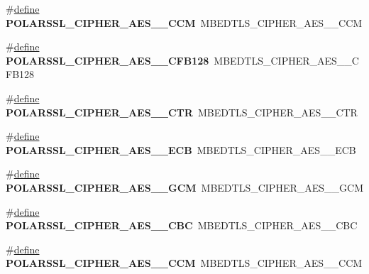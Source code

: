 \begin{DoxyCompactItemize}
\#\hyperlink{structdefine}{define} {\bfseries P\+O\+L\+A\+R\+S\+S\+L\+\_\+\+C\+I\+P\+H\+E\+R\+\_\+\+A\+E\+S\+\_\+\_\+\+C\+CM}~M\+B\+E\+D\+T\+L\+S\+\_\+\+C\+I\+P\+H\+E\+R\+\_\+\+A\+E\+S\+\_\+\_\+\+C\+CM
\item 
\mbox{\label{compat-1_83_8h_ac1717311892a945a0103fe705d33b5af}} 
\#\hyperlink{structdefine}{define} {\bfseries P\+O\+L\+A\+R\+S\+S\+L\+\_\+\+C\+I\+P\+H\+E\+R\+\_\+\+A\+E\+S\+\_\+\_\+\+C\+F\+B128}~M\+B\+E\+D\+T\+L\+S\+\_\+\+C\+I\+P\+H\+E\+R\+\_\+\+A\+E\+S\+\_\+\_\+\+C\+F\+B128
\item 
\mbox{\label{compat-1_83_8h_a02fc8b0fa400bbd5086886d64f4801bc}} 
\#\hyperlink{structdefine}{define} {\bfseries P\+O\+L\+A\+R\+S\+S\+L\+\_\+\+C\+I\+P\+H\+E\+R\+\_\+\+A\+E\+S\+\_\+\_\+\+C\+TR}~M\+B\+E\+D\+T\+L\+S\+\_\+\+C\+I\+P\+H\+E\+R\+\_\+\+A\+E\+S\+\_\+\_\+\+C\+TR
\item 
\mbox{\label{compat-1_83_8h_a94079188ceb153d0ac54217c110e9c79}} 
\#\hyperlink{structdefine}{define} {\bfseries P\+O\+L\+A\+R\+S\+S\+L\+\_\+\+C\+I\+P\+H\+E\+R\+\_\+\+A\+E\+S\+\_\+\_\+\+E\+CB}~M\+B\+E\+D\+T\+L\+S\+\_\+\+C\+I\+P\+H\+E\+R\+\_\+\+A\+E\+S\+\_\+\_\+\+E\+CB
\item 
\mbox{\label{compat-1_83_8h_ad6cbefc10c2ded3011c90cd69a8c69b6}} 
\#\hyperlink{structdefine}{define} {\bfseries P\+O\+L\+A\+R\+S\+S\+L\+\_\+\+C\+I\+P\+H\+E\+R\+\_\+\+A\+E\+S\+\_\+\_\+\+G\+CM}~M\+B\+E\+D\+T\+L\+S\+\_\+\+C\+I\+P\+H\+E\+R\+\_\+\+A\+E\+S\+\_\+\_\+\+G\+CM
\item 
\mbox{\label{compat-1_83_8h_abc86d4acaedeab07fb814973f78ef561}} 
\#\hyperlink{structdefine}{define} {\bfseries P\+O\+L\+A\+R\+S\+S\+L\+\_\+\+C\+I\+P\+H\+E\+R\+\_\+\+A\+E\+S\+\_\+\_\+\+C\+BC}~M\+B\+E\+D\+T\+L\+S\+\_\+\+C\+I\+P\+H\+E\+R\+\_\+\+A\+E\+S\+\_\+\_\+\+C\+BC
\item 
\mbox{\label{compat-1_83_8h_ad62c0dfbfd9693b1051c98e001cb7943}} 
\#\hyperlink{structdefine}{define} {\bfseries P\+O\+L\+A\+R\+S\+S\+L\+\_\+\+C\+I\+P\+H\+E\+R\+\_\+\+A\+E\+S\+\_\+\_\+\+C\+CM}~M\+B\+E\+D\+T\+L\+S\+\_\+\+C\+I\+P\+H\+E\+R\+\_\+\+A\+E\+S\+\_\+\_\+\+C\+CM
\item 
\mbox{\label{compat-1_83_8h_aaa1743222a141ee59b693fea7b9ccb98}} 

\end{DoxyCompactItemize}
